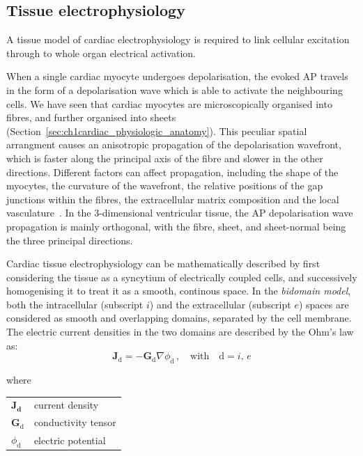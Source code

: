 %
%
%
\subsection{Tissue electrophysiology}\label{sec:tissue_ep_math_modelling}
A tissue model of cardiac electrophysiology is required to link cellular excitation through to whole organ electrical activation.

\vspace{0.2cm}
When a single cardiac myocyte undergoes depolarisation, the evoked AP travels in the form of a depolarisation wave which is able to activate the neighbouring cells. We have seen that cardiac myocytes are microscopically organised into fibres, and further organised into sheets (Section~\ref{sec:ch1cardiac_physiologic_anatomy}). This peculiar spatial arrangment causes an anisotropic propagation of the depolarisation wavefront, which is faster along the principal axis of the fibre and slower in the other directions. Different factors can affect propagation, including the shape of the myocytes, the curvature of the wavefront, the relative positions of the gap junctions within the fibres, the extracellular matrix composition and the local vasculature~\cite{Clayton:2011}. In the $3$-dimensional ventricular tissue, the AP depolarisation wave propagation is mainly orthogonal, with the fibre, sheet, and sheet-normal being the three principal directions.

\vspace{0.2cm}
Cardiac tissue electrophysiology can be mathematically described by first considering the tissue as a syncytium of electrically coupled cells, and successively homogenising it to treat it as a smooth, continous space. In the \textit{bidomain model}, both the intracellular (subscript $i$) and the extracellular (subscript $e$) spaces are considered as smooth and overlapping domains, separated by the cell membrane. The electric current densities in the two domains are described by the Ohm's law as:
%
\begin{equation}\label{eq:ohmslaw}
    \mathbf{J}_{\text{d}} = -\mathbf{G}_{\text{d}}\nabla\phi_{\text{d}}\,,\quad\text{with}\quad \text{d}=i,\,e
\end{equation}

\noindent
where

\vspace{0.2cm}
\begin{tabular}{ll}
    $\mathbf{\mathbf{J}_{\text{d}}}$ & current density \\
    $\mathbf{G}_{\text{d}}$ & conductivity tensor \\
    $\phi_{\text{d}}$ & electric potential \\
\end{tabular}

